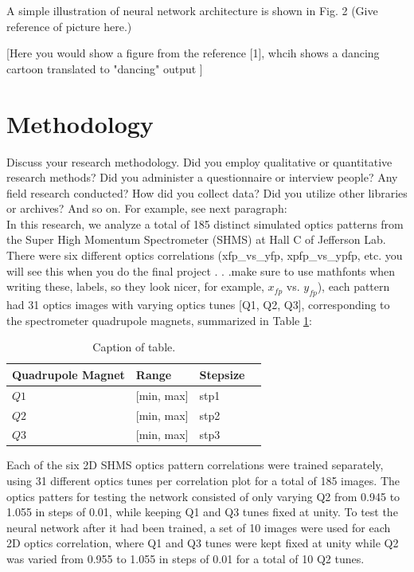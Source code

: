 \documentclass[conference]{IEEEtran}
\begin{document}
A simple illustration of neural network architecture is shown in Fig. 2 (Give reference of picture here.)

[Here you would show a figure from the reference [1], whcih shows a dancing cartoon translated to "dancing" output ]

\section{Methodology}
Discuss your research methodology. Did you employ qualitative or quantitative research methods?
Did you administer a questionnaire or interview people? Any field research conducted? How did you collect data?
Did you utilize other libraries or archives? And so on. For example, see next paragraph:\\
\indent In this research, we analyze a total of 185 distinct simulated optics patterns from the Super High Momentum Spectrometer (SHMS) at Hall C of Jefferson Lab.
There were six different optics correlations (xfp\_vs\_yfp, xpfp\_vs\_ypfp, etc. you will see this when you do the final project . . .make sure to use mathfonts when writing these,
labels, so they look nicer, for example, $x_{fp}$ vs. $y_{fp}$), each pattern had 31 optics images with varying optics tunes [Q1, Q2, Q3], corresponding to the spectrometer quadrupole magnets, summarized in Table \ref{tab:tune_stpSize}:

\begin{table}[h]
	\begin{center}
		\begin{tabular}{llll} %
                  \hline
                  Quadrupole Magnet & Range & Stepsize \\
                  \hline\hline
	          $Q1$ & [min, max] & stp1  \\
                  $Q2$ & [min, max] & stp2  \\
                  $Q3$ & [min, max] & stp3  \\                       
                  \hline 
		\end{tabular}
	\end{center}
	\caption{Caption of table.}
	\label{tab:tune_stpSize}
\end{table}

Each of the six 2D SHMS optics pattern correlations were trained separately, using 31 different optics tunes
per correlation plot for a total of 185 images. The optics patters for testing the network consisted of only
varying Q2 from 0.945 to 1.055 in steps of 0.01, while keeping Q1 and Q3 tunes fixed at unity.
To test the neural network after it had been trained, a set of 10 images were used for each 2D optics correlation, where Q1 and Q3
tunes were kept fixed at unity while Q2 was varied from 0.955 to 1.055 in steps of 0.01 for a total of 10 Q2 tunes.\\
\end{document}
